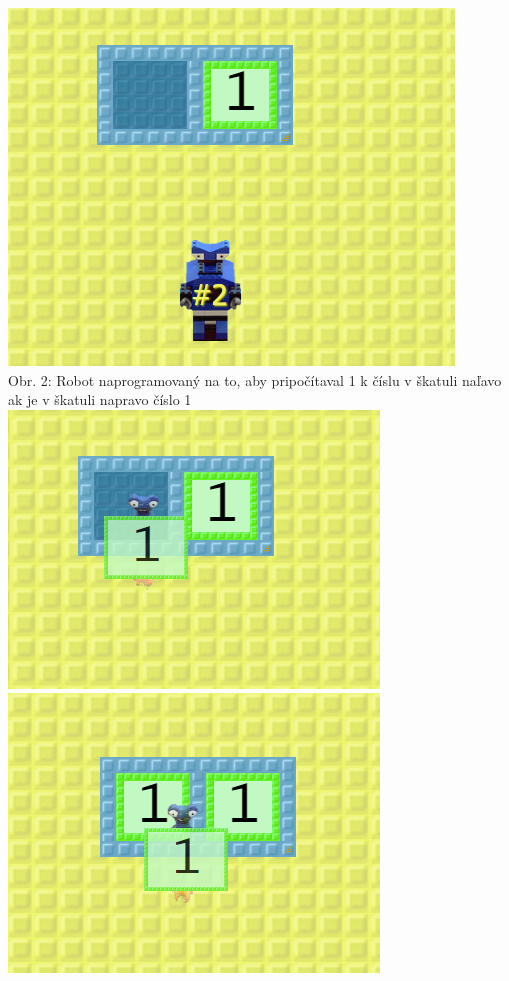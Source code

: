 \documentclass[slovak,a4paper,11pt]{article}
\begin{document}
\begin{center}
\includegraphics[scale=0.5]{toontalkrobot1}
\\ Obr. 2: Robot naprogramovaný na to, aby pripočítaval 1 k číslu v škatuli naľavo ak je v škatuli napravo číslo 1 
\\
\vspace{1cm}
\includegraphics[scale=0.5]{toontalkrobot2}
\includegraphics[scale=0.5]{toontalkrobot3}

\end{center}
\end{document}
